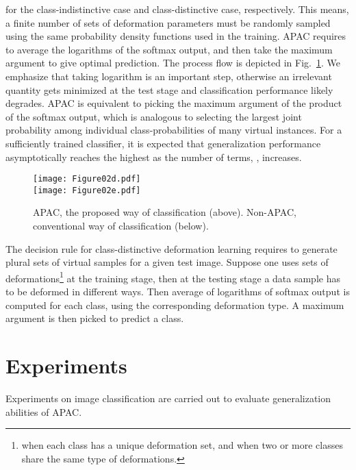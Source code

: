 \documentclass[10pt,twocolumn,letterpaper]{article}
\begin{document}
for the class-indistinctive case and class-distinctive case, respectively.
This means, a finite number of sets of deformation parameters must be randomly sampled
using the same probability density functions used in the 
training.
APAC requires to average the logarithms of the softmax output,
and then take the maximum argument to give optimal prediction.
The process flow is depicted in Fig.~\ref{fig-APAC}.
We emphasize that taking logarithm is an important step,
otherwise an irrelevant quantity gets minimized at the test stage and
classification performance likely degrades.
APAC is equivalent to picking the maximum argument of the product of the softmax output,
which is analogous to selecting the largest joint probability 
among individual class-probabilities of many virtual instances.
For a sufficiently trained classifier, it is expected that generalization performance asymptotically reaches the highest 
as the number of terms, , increases.
\begin{figure}[t]
\begin{center}
\texttt{[image: Figure02d.pdf]}\\ \vspace{-0.0cm}
\texttt{[image: Figure02e.pdf]}
\end{center}
\caption{APAC, the proposed way of classification (above).
Non-APAC, conventional way of classification (below).}
\label{fig-APAC}
\end{figure}

The decision rule for class-distinctive deformation learning
requires to generate plural sets of virtual samples for a given test image.
Suppose one uses  sets of 
deformations\footnote{ when each class has a unique deformation set, and
 when two or more classes share the same type of deformations.}
at the training stage, then
at the testing stage a data sample has to be deformed in  different ways.
Then average of  logarithms of softmax output is computed 
for each class, using the corresponding deformation type.
A maximum argument is then picked to predict a class.





\section{Experiments}

Experiments on image classification are carried out to 
evaluate generalization abilities of APAC.
\end{document}
